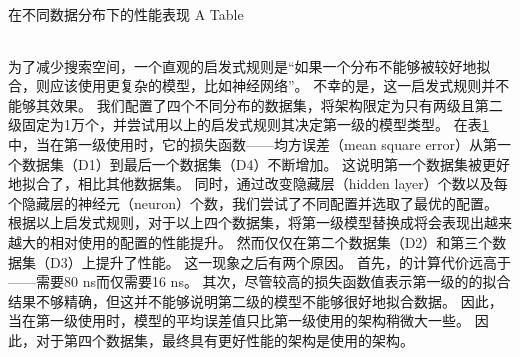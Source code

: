\begin{table}[!hpb]
  \centering
  \bicaption[指向一个表格的表目录索引]
    {{\li}在不同数据分布下的性能表现}
    {A Table}
  \label{tab:dist}
  \begin{tabular}{@{}llr@{}} \toprule
  \end{tabular}
\end{table}

为了减少搜索空间，一个直观的启发式规则是``如果一个分布不能够被{\lr}较好地拟合，则应该使用更复杂的模型，比如神经网络''。
不幸的是，这一启发式规则并不能够其效果。
我们配置了四个不同分布的数据集，将{\li}架构限定为只有两级且第二级固定为1万个{\lr}，并尝试用以上的启发式规则其决定第一级的模型类型。
在表\ref{tab:dist}中，当在第一级使用{\lr}时，它的损失函数{------}均方误差（mean square error）从第一个数据集（D1）到最后一个数据集（D4）不断增加。
这说明第一个数据集被{\lr}更好地拟合了，相比其他数据集。
同时，通过改变隐藏层（hidden layer）个数以及每个隐藏层的神经元（neuron）个数，我们尝试了不同{\nn}配置并选取了最优的{\nn}配置。
根据以上启发式规则，对于以上四个数据集，将第一级模型替换成{\nn}将会表现出越来越大的相对使用{\lr}的{\li}配置的性能提升。
然而{\nn}仅仅在第二个数据集（D2）和第三个数据集（D3）上提升了性能。
这一现象之后有两个原因。
首先，{\nn}的计算代价远高于{\lr}{------}{\nn}需要80 ns而{\lr}仅需要16 ns。
其次，尽管较高的损失函数值表示第一级的{\lr}的拟合结果不够精确，但这并不能够说明第二级的模型不能够很好地拟合数据。
因此，当在第一级使用{\lr}时，模型的平均误差值只比第一级使用{\nn}的架构稍微大一些。
因此，对于第四个数据集，最终具有更好性能的架构是使用{\lr}的架构。

